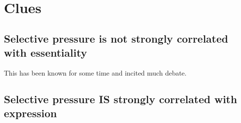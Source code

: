 \section{Clues}

\subsection{Selective pressure is not strongly correlated with essentiality}

    This has been known for some time and incited much debate. 

\subsection{Selective pressure IS strongly correlated with expression}

    
